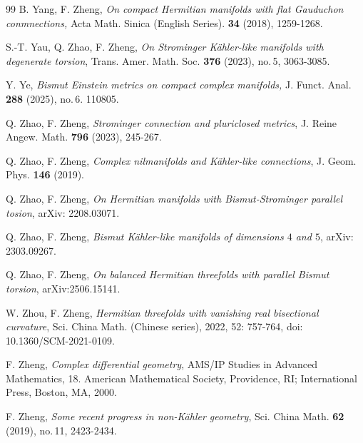 \documentclass{amsart}
\numberwithin{equation}{section}
\theoremstyle{definition}
\renewcommand{\1}{\mathds{1}}
\renewcommand{\>}{\rightarrow}
\begin{document}
\begin{thebibliography}{99}
 B. Yang, F. Zheng,
\newblock \textit{On compact Hermitian manifolds with flat Gauduchon conmnections,}
\newblock Acta Math. Sinica (English Series). {\bf 34} (2018), 1259-1268.

 S.-T. Yau, Q. Zhao, F. Zheng,
\newblock \textit{On Strominger K\"ahler-like manifolds with degenerate torsion},
\newblock Trans. Amer. Math. Soc. \textbf{376} (2023), no.\,5, 3063-3085.


 Y. Ye,
\newblock \textit{Bismut Einstein metrics on compact complex manifolds,}
\newblock J. Funct. Anal. \textbf{288} (2025), no.\,6. 110805.

 Q. Zhao, F. Zheng,
\newblock  \textit{Strominger connection and pluriclosed metrics},
\newblock J. Reine Angew. Math. \textbf{796} (2023), 245-267.

 Q. Zhao, F. Zheng,
\newblock \textit{Complex nilmanifolds and K\"ahler-like connections},
\newblock J. Geom. Phys. {\bf 146} (2019).


 Q. Zhao, F. Zheng,
\newblock \textit{On Hermitian manifolds with Bismut-Strominger parallel tosion},
\newblock arXiv: 2208.03071.

 Q. Zhao, F. Zheng,
\newblock \textit{Bismut K\"ahler-like  manifolds of dimensions $4$ and $5$},
\newblock arXiv: 2303.09267.

 Q. Zhao, F. Zheng,
\newblock \textit{On balanced Hermitian threefolds with parallel Bismut torsion},
\newblock arXiv:2506.15141.

 W. Zhou, F. Zheng,
\newblock \textit{Hermitian threefolds with vanishing real bisectional curvature},
\newblock Sci. China Math. (Chinese series), 2022, 52: 757-764, doi: 10.1360/SCM-2021-0109.

 F. Zheng,
\newblock \textit{Complex differential geometry},
\newblock AMS/IP Studies in Advanced Mathematics, 18. American
Mathematical Society, Providence, RI; International Press, Boston, MA, 2000.

 F. Zheng,
\newblock \textit{Some recent progress in non-K\"ahler geometry},
\newblock Sci. China Math. {\bf 62} (2019), no.\,11, 2423-2434.


\end{thebibliography}
\end{document}
